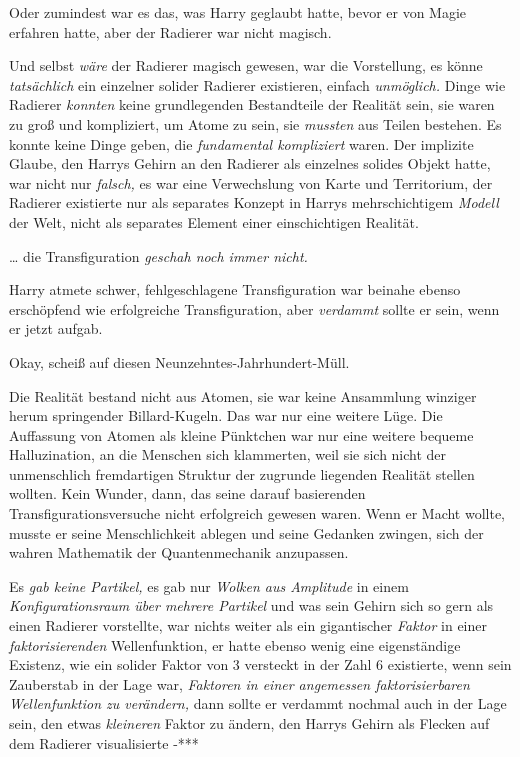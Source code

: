 {Oder zumindest war es das, was Harry geglaubt hatte, bevor er von Magie erfahren hatte, aber der Radierer war nicht magisch.

Und selbst \emph{wäre} der Radierer magisch gewesen, war die Vorstellung, es könne \emph{tatsächlich} ein einzelner solider Radierer existieren, einfach \emph{unmöglich.} Dinge wie Radierer \emph{konnten} keine grundlegenden Bestandteile der Realität sein, sie waren zu groß und kompliziert, um Atome zu sein, sie \emph{mussten} aus Teilen bestehen. Es konnte keine Dinge geben, die \emph{fundamental kompliziert} waren. Der implizite Glaube, den Harrys Gehirn an den Radierer als einzelnes solides Objekt hatte, war nicht nur \emph{falsch,} es war eine Verwechslung von Karte und Territorium, der Radierer existierte nur als separates Konzept in Harrys mehrschichtigem \emph{Modell} der Welt, nicht als separates Element einer einschichtigen Realität.

… die Transfiguration \emph{geschah noch immer nicht.}

Harry atmete schwer, fehlgeschlagene Transfiguration war beinahe ebenso erschöpfend wie erfolgreiche Transfiguration, aber \emph{verdammt} sollte er sein, wenn er jetzt aufgab.

Okay, scheiß auf diesen Neunzehntes-Jahrhundert-Müll.

Die Realität bestand nicht aus Atomen, sie war keine Ansammlung winziger herum springender Billard-Kugeln. Das war nur eine weitere Lüge. Die Auffassung von Atomen als kleine Pünktchen war nur eine weitere bequeme Halluzination, an die Menschen sich klammerten, weil sie sich nicht der unmenschlich fremdartigen Struktur der zugrunde liegenden Realität stellen wollten. Kein Wunder, dann, das seine darauf basierenden Transfigurationsversuche nicht erfolgreich gewesen waren. Wenn er Macht wollte, musste er seine Menschlichkeit ablegen und seine Gedanken zwingen, sich der wahren Mathematik der Quantenmechanik anzupassen.

Es \emph{gab keine Partikel,} es gab nur \emph{Wolken aus Amplitude} in einem \emph{Konfigurationsraum über mehrere Partikel} und was sein Gehirn sich so gern als einen Radierer vorstellte, war nichts weiter als ein gigantischer \emph{Faktor} in einer \emph{faktorisierenden} Wellenfunktion, er hatte ebenso wenig eine eigenständige Existenz, wie ein solider Faktor von 3 versteckt in der Zahl 6 existierte, wenn sein Zauberstab in der Lage war, \emph{Faktoren in einer angemessen faktorisierbaren Wellenfunktion zu verändern,} dann sollte er verdammt nochmal auch in der Lage sein, den etwas \emph{kleineren} Faktor zu ändern, den Harrys Gehirn als Flecken auf dem Radierer visualisierte -***

}
